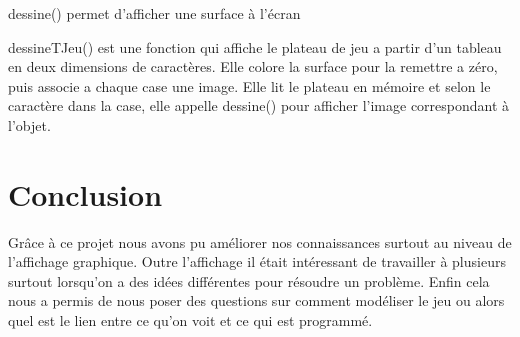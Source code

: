 \documentclass{article}
\begin{document}
dessine() permet d'afficher une surface à l'écran

dessineTJeu() est une fonction qui affiche le plateau de jeu a partir d'un tableau en deux dimensions de caractères.
Elle colore la surface pour la remettre a zéro, puis associe a chaque case une image.
Elle lit le plateau en mémoire et selon le caractère dans la case, elle appelle dessine() pour afficher l'image correspondant à l'objet.

\section*{Conclusion}
Grâce à ce projet nous avons pu améliorer nos connaissances surtout au niveau de l'affichage graphique.
Outre l'affichage il était intéressant de travailler à plusieurs surtout lorsqu'on a des idées différentes pour résoudre un problème.
Enfin cela nous a permis de nous poser des questions sur comment modéliser le jeu ou alors quel est le lien entre ce qu'on voit et ce qui est programmé.
\end{document}
